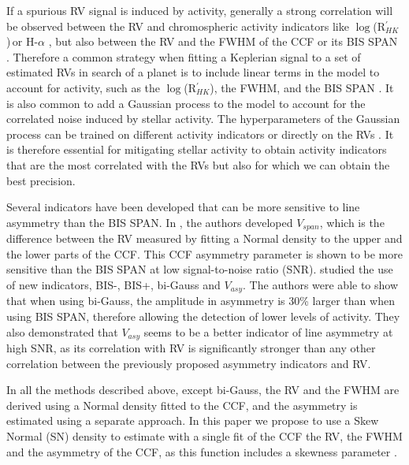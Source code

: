 \documentclass{aa}
\def\logrhk{$\log$(R$^{\prime}_{HK}$)}
\begin{document}
If a spurious RV signal is induced by activity, generally a strong correlation will be observed between the RV and chromospheric activity indicators like \logrhk\,or H-$\alpha$ \citep{Boisse-2009,Dumusque-2012,Robertson-2014}, but also between the RV and the FWHM of the CCF or its BIS SPAN \citep[][]{Queloz-2001,Boisse-2009,Queloz-2009,Dumusque-2016a}. 
%
Therefore a common strategy when fitting a Keplerian signal to a set of estimated RVs in search of a planet is to include linear terms in the model to account for activity, such as the \logrhk, the FWHM, and the BIS SPAN \citep{Dumusque:2017aa,Feng:2017aa}.
%
It is also common to add a Gaussian process to the model to account for the correlated noise induced by stellar activity. The hyperparameters of the Gaussian process can be trained on different activity indicators \citep{Haywood-2014,Rajpaul-2015} or directly on the RVs \citep{Faria-2016a}. It is therefore essential for mitigating stellar activity to obtain activity indicators that are the most correlated with the RVs but also for which we can obtain the best precision.

Several indicators have been developed that can be more sensitive to line asymmetry than the BIS SPAN. In \citet{Boisse-2011}, the authors developed $V_{span}$, which is the difference between the RV measured by fitting a Normal density to the upper and the lower parts of the CCF. This CCF asymmetry parameter is shown to be more sensitive than the BIS SPAN at low signal-to-noise ratio (SNR).
%
\citet{Figueira-2013} studied the use of new indicators, BIS-, BIS+, bi-Gauss and $V_{asy}$. The authors were able to show that when using bi-Gauss, the amplitude in asymmetry is 30\% larger than when using BIS SPAN, therefore allowing the detection of lower levels of activity. They also demonstrated that $V_{asy}$ seems to be a better indicator of line asymmetry at high SNR, as its correlation with RV is significantly stronger than any other correlation between the previously proposed asymmetry indicators and RV.

In all the methods described above, except bi-Gauss, the RV and the FWHM are derived using a Normal density fitted to the CCF, and the asymmetry is estimated using a separate approach. 
%
In this paper we propose to use a Skew Normal (SN) density to estimate with a single fit of the CCF the RV, the FWHM and the asymmetry of the CCF, as this function includes a skewness parameter \citep[][]{Azzalini1985}. 
\end{document}
